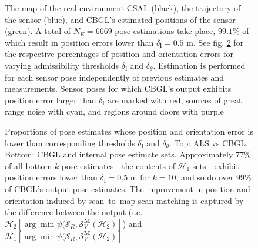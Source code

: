 \begin{figure}
  \vspace{-0.7cm}
  
  \vspace{-0.7cm}
  \caption{\small The map of the real environment CSAL (black), the trajectory
           of the sensor (blue), and CBGL's estimated positions of the sensor
           (green). A total of $N_E = 6669$ pose estimations take place,
           $99.1\%$ of which result in position errors lower than
           $\delta_{\bm{l}} = 0.5$ m. See fig. \ref{fig:a:awesomeness}
           for the respective percentages of position and orientation errors
           for varying admissibility thresholds $\delta_{\bm{l}}$ and
           $\delta_{\theta}$.
           Estimation is performed for each sensor
           pose independently of previous estimates and measurements. Sensor
           poses for which CBGL's output exhibits position error larger than
           $\delta_{\bm{l}}$ are marked with red, sources of great
           range noise with cyan, and regions around doors with purple
           }
  \label{fig:a:map_and_trajectory}
  \vspace{-0.5cm}
\end{figure}

\begin{figure}
  \vspace{-0.3cm}
  
  \vspace{0.01cm}
  \caption{\small Proportions of pose estimates whose position and orientation
           error is lower than corresponding thresholds $\delta_{\bm{l}}$ and
           $\delta_{\theta}$. Top: ALS vs CBGL. Bottom: CBGL and internal pose
           estimate sets.  Approximately $77\%$ of all bottom-$k$ pose
           estimates---the contents of $\mathcal{H}_1$ sets---exhibit
           position errors lower than $\delta_{\bm{l}} = 0.5$ m for $k=10$, and
           so do over $99\%$ of CBGL's output pose estimates. The improvement in
           position and orientation induced by scan--to--map-scan matching is
           captured by the difference between the output (i.e.
           $\mathcal{H}_2[\arg \min \psi(\mathcal{S}_R, \mathcal{S}_V^{\bm{M}}(\mathcal{H}_2)]$) and
           $\mathcal{H}_1[\arg \min \psi(\mathcal{S}_R, \mathcal{S}_V^{\bm{M}}(\mathcal{H}_2)]$}
  \vspace{-0.7cm}
  \label{fig:a:awesomeness}
\end{figure}


